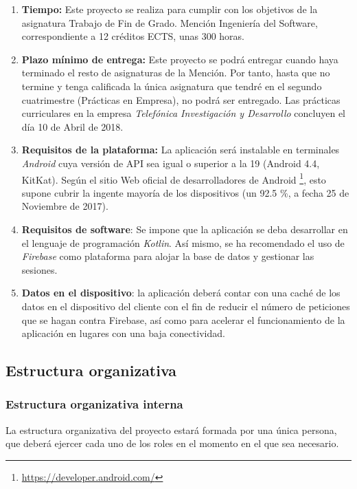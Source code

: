 \documentclass[twoside]{report}
\begin{document}
\begin{enumerate}
\item \textbf{Tiempo:} Este proyecto se realiza para cumplir con los objetivos de la asignatura Trabajo de Fin de Grado. Mención Ingeniería del Software, correspondiente a 12 créditos ECTS, unas 300 horas.

\item \textbf{Plazo mínimo de entrega:} Este proyecto se podrá entregar cuando haya terminado el resto de asignaturas de la Mención. Por tanto, hasta que no termine y tenga calificada la única asignatura que tendré en el segundo cuatrimestre (Prácticas en Empresa), no podrá ser entregado. Las prácticas curriculares en la empresa \textit{Telefónica Investigación y Desarrollo} concluyen el día 10 de Abril de 2018.

\item \textbf{Requisitos de la plataforma:} La aplicación será instalable en terminales \textit{Android} cuya versión de API sea igual o superior a la 19 (Android 4.4, KitKat). Según el sitio Web oficial de desarrolladores de Android \footnote{\url{https://developer.android.com/}}, esto supone cubrir la ingente mayoría de los dispositivos (un 92.5 \%, a fecha 25 de Noviembre de 2017)\cite{androidversiondist}.

\item \textbf{Requisitos de software}: Se impone que la aplicación se deba desarrollar en el lenguaje de programación \textit{Kotlin}. Así mismo, se ha recomendado el uso de \textit{Firebase} como plataforma para alojar la base de datos y gestionar las sesiones.

\item \textbf{Datos en el dispositivo}: la aplicación deberá contar con una caché de los datos en el dispositivo del cliente con el fin de reducir el número de peticiones que se hagan contra Firebase, así como para acelerar el funcionamiento de la aplicación en lugares con una baja conectividad.
\end{enumerate}

\subsection{Estructura organizativa}
\subsubsection{Estructura organizativa interna}
La estructura organizativa del proyecto estará formada por una única persona, que deberá ejercer cada uno de los roles en el momento en el que sea necesario. \cite{upedu} \vspace{0.5cm}
\end{document}
